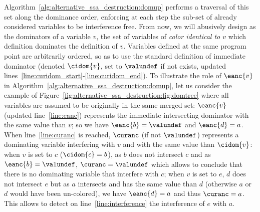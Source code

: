 Algorithm~\ref{alg:alternative_ssa_destruction:domup} performs a traversal of this set along the dominance order, enforcing at each step the sub-set of already considered variables to be interference free. From now, we will abusively design as the dominators of a variable $v$, the set of variables of \emph{color identical to $v$} which definition dominates the definition of $v$. Variables defined at the same program point are arbitrarily ordered, so as to use the standard definition of immediate dominator (denoted $\cidom{v}$, set to $\valundef$ if not exists, updated lines~\ref{line:curidom_start}-\ref{line:curidom_end}).
To illustrate the role of $\eanc{v}$ in Algorithm~\ref{alg:alternative_ssa_destruction:domup}, let us consider the example of Figure~\ref{fig:alternative_ssa_destruction:fig:domtree} where all variables are assumed to be originally in the same merged-set: $\eanc{v}$ (updated line~\ref{line:eanc}) represents the immediate intersecting dominator with the same value than $v$; so we have $\eanc{b}=\valundef$ and $\eanc{d}=a$. When line~\ref{line:curanc} is reached, $\curanc$ (if not $\valundef$) represents a dominating variable interfering with $v$ and with the same value than $\cidom{v}$: when $v$ is set to $c$ ($\cidom{c}=b$), as $b$ does not intersect $c$ and as $\eanc{b}=\valundef$, $\curanc=\valundef$ which allows to conclude that there is no dominating variable that interfere with $c$; when $v$ is set to $e$, $d$ does not intersect $e$ but as $a$ intersects and has the same value than $d$ (otherwise $a$ or $d$ would have been un-colored), we have $\eanc{d}=a$ and thus $\curanc=a$. This allows to detect on line~\ref{line:interference} the interference of $e$ with $a$. 

